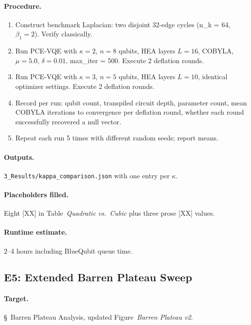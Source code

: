 \documentclass[11pt]{article}
\begin{document}
\paragraph*{Procedure.}
\begin{enumerate}[leftmargin=*]
  \item Construct benchmark Laplacian: two disjoint 32-edge cycles
        (n\_k = 64, $\beta_1 = 2$). Verify classically.
  \item Run PCE-VQE with $\kappa = 2$, $n = 8$ qubits, HEA layers
        $L = 16$, COBYLA, $\mu = 5.0$, $\delta = 0.01$, max\_iter =
        500. Execute 2 deflation rounds.
  \item Run PCE-VQE with $\kappa = 3$, $n = 5$ qubits, HEA layers
        $L = 10$, identical optimizer settings. Execute 2 deflation
        rounds.
  \item Record per run: qubit count, transpiled circuit depth,
        parameter count, mean COBYLA iterations to convergence
        per deflation round, whether each round successfully
        recovered a null vector.
  \item Repeat each run 5 times with different random seeds; report
        means.
\end{enumerate}

\paragraph*{Outputs.} \texttt{3\_Results/kappa\_comparison.json}
with one entry per $\kappa$.

\paragraph*{Placeholders filled.} Eight [XX] in
Table~\emph{Quadratic vs.\ Cubic} plus three prose [XX] values.

\paragraph*{Runtime estimate.} 2--4 hours including BlueQubit queue
time.

\subsection{E5: Extended Barren Plateau Sweep}

\paragraph*{Target.} \S~Barren Plateau Analysis, updated
Figure~\emph{Barren Plateau v2}.
\end{document}
